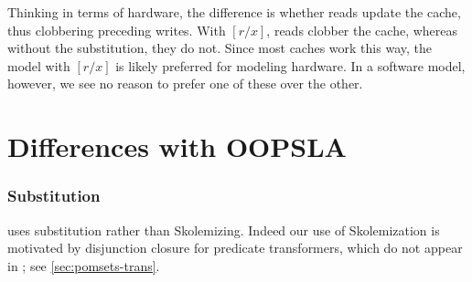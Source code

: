 Thinking in terms of hardware, the difference is whether reads update the
cache, thus clobbering preceding writes.  With $[r/x]$, reads clobber the
cache, whereas without the substitution, they do not.  Since most caches work
this way, the model with $[r/x]$ is likely preferred for modeling hardware.
In a software model, however, we see no reason to prefer one of these over
the other.


\begin{comment}
  if in L6 we said [x/r], that says we know read the local version...  ignoring
  the value read...  Perhaps there is some intervening stuff that stops you
  from seeing the local state, such as release-acquire

  We could potentially get rid of [x/r] If you do two reads, your not allowed
  to be independent of the second based on the value that was read in the first
  read.

  x=0; r=x; if (r=1) { s=x; if (s=?) {y=1}}
  read 1 then 2.


  In order for the write to be independent of second read what does its
  precondition have to be.
  [r/x] then s==1
  no sub then s==0

  (s=? | Wy1)

  if (phi) z=1
  phi = s is even
  phi = s < 2

  With substitution you are saying you know that the ``local copy'' of x is the
  same as r.  Sitting in the local cache.  Read might have gone to main
  memory, but if it did it has updated the cache line so that the local copy is
  what I just read.

  If second read is a cache hit, then I know that I am seeing the same value.

  If we take substitution out then 
\end{comment}


\section{Differences with OOPSLA}
\label{sec:diff}

\subsubsection*{Substitution}

\jjr{} uses substitution rather than Skolemizing.  Indeed our use of
Skolemization is motivated by disjunction closure for predicate transformers,
which do not appear in \jjr{}; see \textsection\ref{sec:pomsets-trans}.

